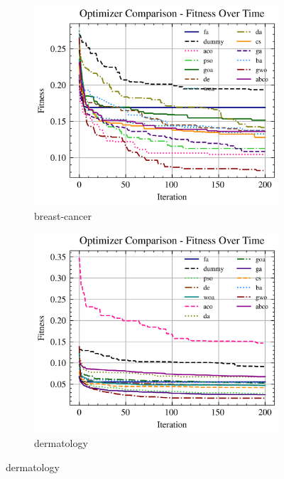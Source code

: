 \begin{figure}[htp]
    \centering
    \begin{subfigure}[htp]{0.45\textwidth}
        \includegraphics[width=\textwidth]{imagenes/fitness_charts/img/binary/breast-cancer/optimizers_fitness_svc.png}
        \caption{breast-cancer}
    \end{subfigure}
    \begin{subfigure}[htp]{0.45\textwidth}
        \includegraphics[width=\textwidth]{imagenes/fitness_charts/img/binary/dermatology/optimizers_fitness_svc.png}
        \caption{dermatology}
    \end{subfigure}


\end{figure}
